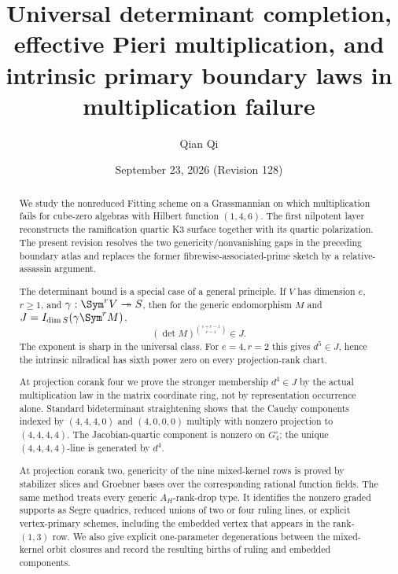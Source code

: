 \title[Universal determinant completion and boundary laws]{Universal determinant completion, effective Pieri multiplication, and intrinsic primary boundary laws in multiplication failure}
\author{Qian Qi}
\date{September 23, 2026 \quad (Revision 128)}
\begin{abstract}
We study the nonreduced Fitting scheme on a Grassmannian on which
multiplication fails for cube-zero algebras with Hilbert function
\((1,4,6)\).  The first nilpotent layer reconstructs the ramification
quartic K3 surface together with its quartic polarization.  The present
revision resolves the two genericity/nonvanishing gaps in the preceding
boundary atlas and replaces the former fibrewise-associated-prime sketch
by a relative-assassin argument.

The determinant bound is a special case of a general principle.  If
\(V\) has dimension \(e\), \(r\ge1\), and
\(\gamma:\Sym^rV\twoheadrightarrow S\), then for the generic
endomorphism \(M\) and \(J=I_{\dim S}(\gamma\Sym^rM)\),
\[
 (\det M)^{\binom{e+r-1}{r-1}}\in J.
\]
The exponent is sharp in the universal class.  For \(e=4,r=2\) this
gives \(d^5\in J\), hence the intrinsic nilradical has sixth power
zero on every projection-rank chart.

At projection corank four we prove the stronger membership \(d^4\in J\)
by the actual multiplication law in the matrix coordinate ring, not by
representation occurrence alone.  Standard bideterminant straightening
shows that the Cauchy components indexed by
\((4,4,4,0)\) and \((4,0,0,0)\) multiply with nonzero projection
to \((4,4,4,4)\).  The Jacobian-quartic component is nonzero on
\(G_4^\circ\); the unique \((4,4,4,4)\)-line is generated by
\(d^4\).

At projection corank two, genericity of the nine mixed-kernel rows is
proved by stabilizer slices and Groebner bases over the corresponding
rational function fields.  The same method treats every generic
\(A_H\)-rank-drop type.  It identifies the nonzero graded supports
as Segre quadrics, reduced unions of two or four ruling lines, or
explicit vertex-primary schemes, including the embedded vertex that
appears in the rank-\((1,3)\) row.  We also give explicit one-parameter
degenerations between the mixed-kernel orbit closures and record the
resulting births of ruling and embedded components.


\end{abstract}
